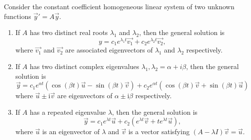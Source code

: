 \begin{theorem}
  Consider the constant coefficient homogeneous linear system of two unknown functions $\vec{y}'=A\vec{y}$.
\begin{enumerate}[label=\textbf{Case \arabic*:}, align=left]
  \item If $A$ has two distinct real roots $\lambda_1$ and $\lambda_2$, then the general solution is
  \[y=c_1e^{\lambda_1 t}\vec{v_1} + c_2e^{\lambda_2 t}\vec{v_2},\]
where $\vec{v_1}$ and $\vec{v_2}$ are associated eigenvectors of $\lambda_1$ and $\lambda_2$ respectively.

  \item 
  If $A$ has two distinct complex eigenvalues $\lambda_1,\lambda_2=\alpha+i\beta$, then the general solution is
  \[
  \vec{y}=
  c_1e^{\alpha t}(\cos(\beta t)\vec{u}-\sin(\beta t)\vec{v}) + 
  c_2e^{\alpha t}(\cos(\beta t)\vec{v}+ \sin(\beta t)\vec{u})
  \]
  where $\vec{u}\pm \mathrm{i} \vec{v}$ are eigenvectors of $\alpha\pm \mathrm{i}\beta$ respectively.

  \item If $A$ has a repeated eigenvalue $\lambda$, then the general solution is
  \[
    \vec{y}=
    c_1e^{\lambda t}\vec{u} +
    c_2(e^{\lambda t}\vec{v} + te^{\lambda t}\vec{u}),
  \]
  where $\vec{u}$ is an eigenvector of $\lambda$ and $\vec{v}$ is a vector satisfying $(A-\lambda I)\vec{v}=\vec{u}$.
\end{enumerate}
\end{theorem}

